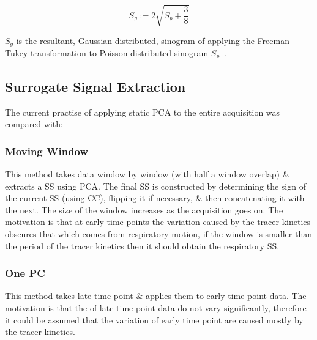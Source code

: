         \vspace{-0.25cm}
        
        \begin{equation}
            S_g := 2 \sqrt{S_p + \frac{3}{8}}
        \end{equation}
        
        \vspace{-0.0cm}
        
        \noindent $S_g$ is the resultant, Gaussian distributed, sinogram of applying the Freeman-Tukey transformation to Poisson distributed sinogram $S_p$~\cite{Freeman1950TransformationsRoot}.
        
    \vspace{-0.5cm}
    
    \subsection{Surrogate Signal Extraction} \label{sec:surrogate_signal_extraction}
        The current practise of applying static \gls{PCA} to the entire acquisition was compared with:
        
        \subsubsection{Moving Window} \label{sec:moving_window}
            This method takes data window by window (with half a window overlap) \& extracts a \gls{SS} using \gls{PCA}. The final \gls{SS} is constructed by determining the sign of the current \gls{SS} (using \gls{CC}), flipping it if necessary, \& then concatenating it with the next. The size of the window increases as the acquisition goes on. The motivation is that at early time points the variation caused by the tracer kinetics obscures that which comes from respiratory motion, if the window is smaller than the period of the tracer kinetics then it should obtain the respiratory \gls{SS}.
        
        \subsubsection{One \gls{PC}} \label{sec:one_pc}
            This method takes late time point  \& applies them to early time point data. The motivation is that the  of late time point data do not vary significantly, therefore it could be assumed that the variation of early time point  are caused mostly by the tracer kinetics.
        
